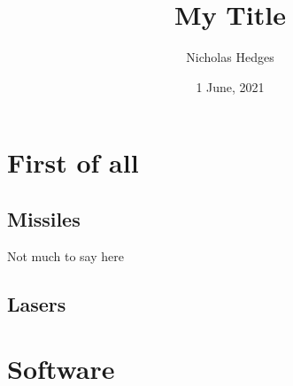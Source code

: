 \documentclass{apa-article}
\title{My Title}
\author{Nicholas Hedges}
\date{1 June, 2021}
\begin{document}
\maketitle

\section{First of all}
\lipsum
\subsection{Missiles}
Not much to say here \cite{BobsBook01}
\subsection{Lasers}
\section{Software}


\end{document}
